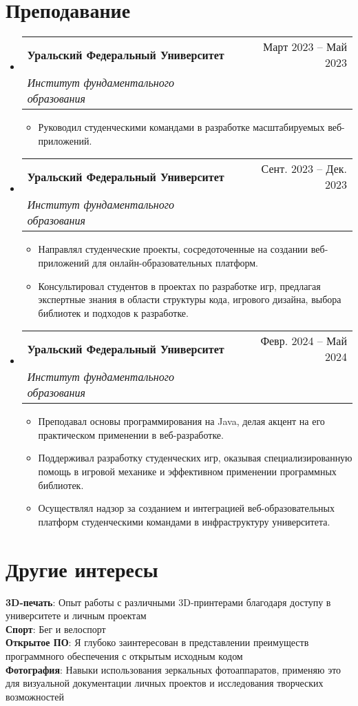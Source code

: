 \documentclass[a4paper,11pt]{article}
\makeatletter
\newcommand{\resumeItem}[1]{
    \item{
                {#1 \vspace{-4pt}}
          }
}
\newcommand{\resumeSubheading}[4]{
    \vspace{-2pt}\item
    \begin{tabular*}{0.97\textwidth}[t]{l@{\extracolsep{\fill}}r}
        \textbf{#1} & #2 \\
        \textit{\small #3} & \textit{\small #4} \\
    \end{tabular*}\vspace{-10pt}
}
\newcommand{\resumeSubHeadingListStart}{\begin{itemize}[leftmargin=0.15in, label={}]}
\newcommand{\resumeSubHeadingListEnd}{\end{itemize}}
\newcommand{\resumeItemListStart}{\begin{itemize}}
\newcommand{\resumeItemListEnd}{\end{itemize}\vspace{-2pt}}
\makeatother
\begin{document}
\section{Преподавание}
\resumeSubHeadingListStart
    \resumeSubheading
        {Уральский Федеральный Университет}{Март 2023 -- Май 2023}
        {Институт фундаментального образования}{}
        \resumeItemListStart
            \small\resumeItem{Руководил студенческими командами в разработке масштабируемых веб-приложений.}
        \resumeItemListEnd

    \resumeSubheading
        {Уральский Федеральный Университет }{Сент. 2023 -- Дек. 2023}
        {Институт фундаментального образования}{}
        \resumeItemListStart
            \small\resumeItem{Направлял студенческие проекты, сосредоточенные на создании веб-приложений для онлайн-образовательных платформ.}
            \resumeItem{Консультировал студентов в проектах по разработке игр, предлагая экспертные знания в области структуры кода, игрового дизайна, выбора библиотек и подходов к разработке.}
        \resumeItemListEnd

    \resumeSubheading
        {Уральский Федеральный Университет}{Февр. 2024 -- Май 2024}
        {Институт фундаментального образования}{}
        \resumeItemListStart
            \small\resumeItem{Преподавал основы программирования на Java, делая акцент на его практическом применении в веб-разработке.}
            \resumeItem{Поддерживал разработку студенческих игр, оказывая специализированную помощь в игровой механике и эффективном применении программных библиотек.}
            \resumeItem{Осуществлял надзор за созданием и интеграцией веб-образовательных платформ студенческими командами в инфраструктуру университета.}
        \resumeItemListEnd
\resumeSubHeadingListEnd

\section{Другие интересы}
\begin{itemize}[leftmargin=0.15in, label={}]
    \normalsize{\item{
            \textbf{3D-печать}{: Опыт работы с различными 3D-принтерами благодаря доступу в университете и личным проектам} \\
            \textbf{Спорт}{: Бег и велоспорт} \\
            \textbf{Открытое ПО}{: Я глубоко заинтересован в представлении преимуществ программного обеспечения с открытым исходным кодом} \\
            \textbf{Фотография}{: Навыки использования зеркальных фотоаппаратов, применяю это для визуальной документации личных проектов и исследования творческих возможностей} \\
    }}    
\end{itemize}
\end{document}
